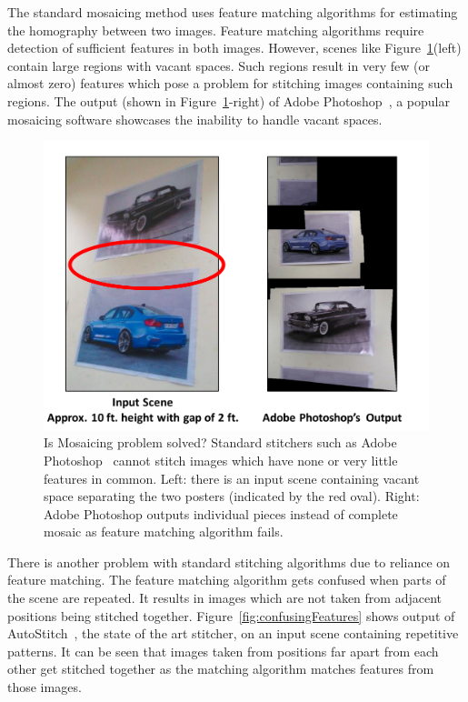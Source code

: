 \begin{itemize}
  The standard mosaicing method uses feature matching algorithms for
  estimating the homography between two images. Feature matching algorithms
  require detection of sufficient features in both images. However, scenes like
  Figure~\ref{fig:vacantSpacesExample}(left) contain large regions with vacant
  spaces. Such regions result in very few (or almost zero) features which pose
  a problem for stitching images containing such regions. The output (shown in
  Figure~\ref{fig:vacantSpacesExample}-right) of Adobe Photoshop~\cite{photoshop}, 
  a popular mosaicing software showcases the inability to handle vacant spaces.
  
 \begin{figure}[h!]
\centering
\includegraphics[width=0.98\linewidth]{figures/vacantSpacesExample}
 \caption[Problem of mosaicing scene with vacant spaces using Adobe
 Photoshop]{Is Mosaicing problem solved? Standard stitchers such as Adobe
 Photoshop~\cite{photoshop} cannot stitch images which have none or very little
 features in common. Left: there is an input scene containing vacant space
 separating the two posters (indicated by the red oval). Right: Adobe Photoshop
 outputs individual pieces instead of complete mosaic as feature matching
 algorithm fails.}
\label{fig:vacantSpacesExample}
\end{figure}
 
  There is another problem with standard stitching algorithms due to 
  reliance on feature matching. The feature matching algorithm gets confused
  when parts of the scene are repeated. It results in images which are not
  taken from adjacent positions being stitched together.
  Figure~\ref{fig:confusingFeatures} shows output of
  AutoStitch~\cite{autostitch}, the state of the art stitcher, on an input scene
  containing repetitive patterns. It can be seen that images taken from
  positions far apart from each other get stitched together as the matching
  algorithm matches features from those images.


\end{itemize}
